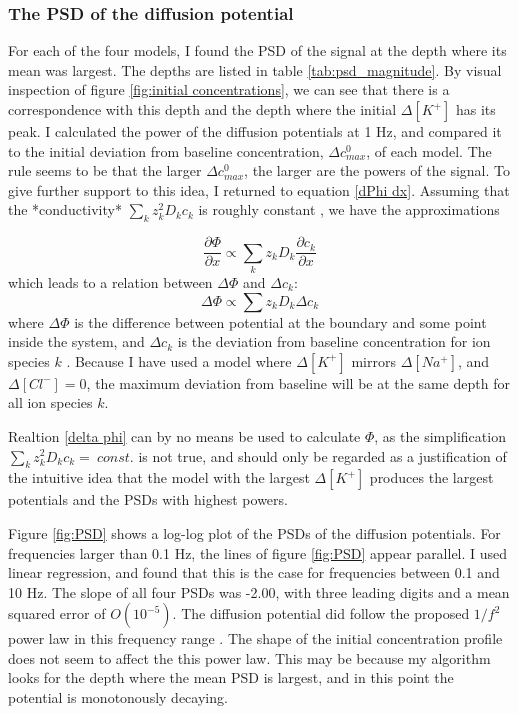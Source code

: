 \documentclass{article}
\begin{document}
\subsubsection{The PSD of the diffusion potential}\label{calculated PSDs}
For each of the four models, I found the PSD of the signal at the depth where its mean was largest. The depths are listed in table \ref{tab:psd_magnitude}. By visual inspection of figure \ref{fig:initial concentrations}, we can see that there is a correspondence with this depth and the depth where the initial $\Delta [K^+]$ has its peak. 
I calculated the power of the diffusion potentials at 1 Hz, and compared it to the initial deviation from baseline concentration, $\Delta c^0_{max}$, of each model. The rule seems to be that the larger  $\Delta c^0_{max}$, the larger are the powers of the signal. To give further support to this idea, I returned to equation \ref{dPhi dx}. Assuming that the *conductivity* $\sum_k z_k^2 D_k c_k$ is roughly constant \cite{Halens2016}, we have the approximations

\begin{equation}
 \frac{\partial \Phi}{\partial x}  \propto { \sum_k z_k D_k \frac{\partial c_k}{\partial x} }
\end{equation}
which leads to a relation between $\Delta \Phi$ and $\Delta c_k$:
\begin{equation}\label{delta phi}
 \Delta \Phi \propto \sum z_k D_k \Delta c_k
\end{equation}
where $\Delta \Phi $ is the difference between potential at the boundary and some point inside the system, and $\Delta c_k $ is the deviation from baseline concentration for ion species $k$ . Because I have used a model where $\Delta [K^+]$ mirrors $\Delta [Na^+]$, and $\Delta [Cl^-] =0$, the maximum deviation from baseline will be at the same depth for all ion species $k$.



Realtion \ref{delta phi} can by no means be used to calculate $\Phi$, as the simplification $\sum_k z_k^2 D_k c_k =\ const.$ is not true, and should only be regarded as a justification of the intuitive idea that the model with the largest $\Delta [K^+]$ produces the largest potentials and the PSDs with highest powers. 


Figure \ref{fig:PSD} shows a log-log plot of the PSDs of the diffusion potentials.  For frequencies larger than 0.1 Hz, the lines of figure \ref{fig:PSD} appear parallel. I used linear regression, and found that this is the case for frequencies between 0.1 and 10 Hz. The slope of all four PSDs was -2.00, with three leading digits and a mean squared error of $O(10^{-5})$. The diffusion potential did follow the proposed  $1/f^2$ power law in this frequency range \cite{Halnes2016}. The shape of the initial concentration profile does not seem to affect the this power law. This may be because my algorithm looks for the depth where the mean PSD is largest, and in this point the potential is monotonously decaying. 
\end{document}
